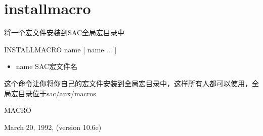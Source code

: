 \section{installmacro}
\label{cmd:installmacro}

将一个宏文件安装到SAC全局宏目录中

INSTALLMACRO name [ name ... ]

\begin{itemize}
\item name SAC宏文件名
\end{itemize}

这个命令让你将你自己的宏文件安装到全局宏目录中，这样所有人都可以使用，全局宏目录位于sac/aux/macros

MACRO

March 20, 1992, (version 10.6e)
